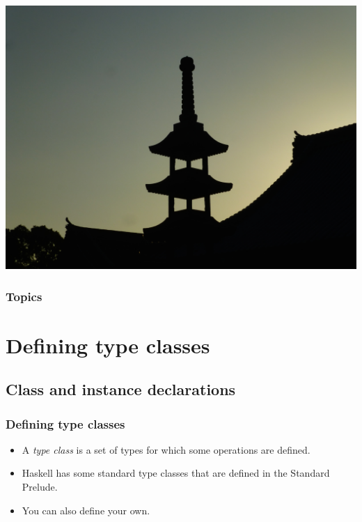 \documentclass{beamer}
\begin{document}
\begin{frame}[fragile]
  \PresentationTitleSlide
\end{frame}
\begin{frame}
\begin{center}
\includegraphics[scale=0.2]
    {figures/jpg/pic07b.jpg}
\end{center}
\end{frame}
\begin{frame}[fragile]
  \frametitle{Topics}
  \tableofcontents
\end{frame}


\section{Defining type classes}

\subsection{Class and instance declarations}

\begin{frame}[fragile]
\frametitle{Defining type classes}

\begin{itemize}
\item A \emph{type class} is a set of types for which some
  operations are defined.
\item Haskell has some standard type classes that are defined in
  the Standard Prelude.
\item You can also define your own.
\end{itemize}

\end{frame}
\end{document}

